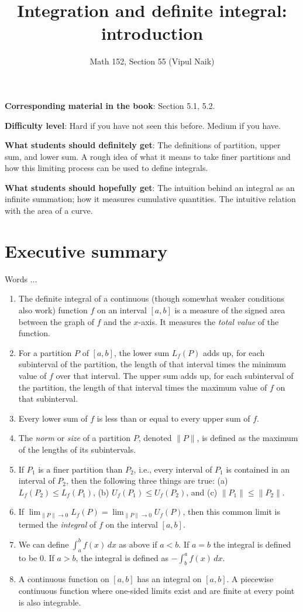 \documentclass{amsart}
\title{Integration and definite integral: introduction}
\author{Math 152, Section 55 (Vipul Naik)}
\begin{document}
\maketitle

{\bf Corresponding material in the book}: Section 5.1, 5.2.

{\bf Difficulty level}: Hard if you have not seen this before. Medium
if you have.

{\bf What students should definitely get}: The definitions of
partition, upper sum, and lower sum. A rough idea of what it means to
take finer partitions and how this limiting process can be used to
define integrals.

{\bf What students should hopefully get}: The intuition behind an
integral as an infinite summation; how it measures cumulative
quantities. The intuitive relation with the area of a curve.

\section*{Executive summary}

Words ...

\begin{enumerate}
\item The definite integral of a continuous (though somewhat weaker
  conditions also work) function $f$ on an interval $[a,b]$ is a measure
  of the signed area between the graph of $f$ and the $x$-axis. It
  measures the {\em total value} of the function.
\item For a partition $P$ of $[a,b]$, the lower sum $L_f(P)$ adds up,
  for each subinterval of the partition, the length of that interval
  times the minimum value of $f$ over that interval. The upper sum
  adds up, for each subinterval of the partition, the length of that
  interval times the maximum value of $f$ on that subinterval.
\item Every lower sum of $f$ is less than or equal to every upper sum
  of $f$.
\item The {\em norm} or {\em size} of a partition $P$, denoted $\| P
  \|$, is defined as the maximum of the lengths of its
  subintervals.
\item If $P_1$ is a finer partition than $P_2$, i.e., every interval
  of $P_1$ is contained in an interval of $P_2$, then the following
  three things are true: (a) $L_f(P_2) \le L_f(P_1)$, (b) $U_f(P_1)
  \le U_f(P_2)$, and (c) $\| P_1 \| \le \| P_2 \|$.
\item If $\lim_{\| P \| \to 0} L_f(P) = \lim_{\| P \| \to 0} U_f(P)$,
  then this common limit is termed the {\em integral} of $f$ on the
  interval $[a,b]$.
\item We can define $\int_a^b f(x) \, dx$ as above if $a < b$. If $a =
  b$ the integral is defined to be $0$. If $a > b$, the integral is
  defined as $-\int_b^a f(x) \, dx$.
\item A continuous function on $[a,b]$ has an integral on $[a,b]$. A
  piecewise continuous function where one-sided limits exist and are
  finite at every point is also integrable.
\end{enumerate}
\end{document}
